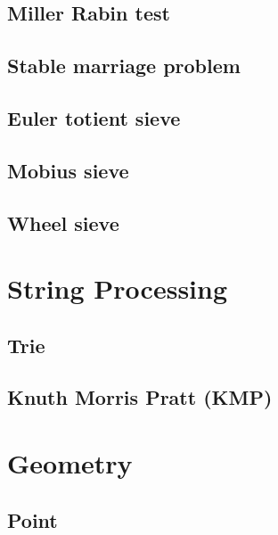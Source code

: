 \subsection{Miller Rabin test}
\raggedbottom
\hrulefill
\subsection{Stable marriage problem}
\raggedbottom
\hrulefill
\subsection{Euler totient sieve}
\raggedbottom
\hrulefill
\subsection{Mobius sieve}
\raggedbottom
\hrulefill
\subsection{Wheel sieve}
\raggedbottom
\hrulefill


\section{String Processing}
\subsection{Trie}
\raggedbottom
\hrulefill
\subsection{Knuth Morris Pratt (KMP)}
\raggedbottom
\hrulefill


\section{Geometry}
\subsection{Point}
\raggedbottom
\hrulefill


